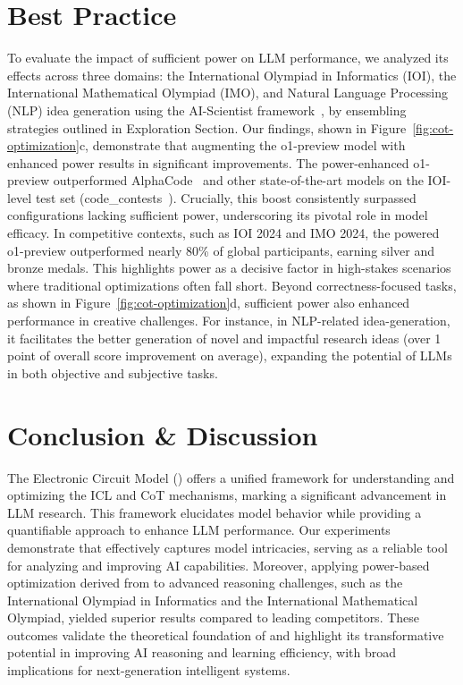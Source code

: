 \section{Best Practice}
To evaluate the impact of sufficient power on LLM performance, we analyzed its effects across three domains: the International Olympiad in Informatics (IOI), the International Mathematical Olympiad (IMO), and Natural Language Processing (NLP) idea generation using the AI-Scientist framework~\cite{lu2024aiscientist}, by ensembling strategies outlined in Exploration Section.
Our findings, shown in Figure~\ref{fig:cot-optimization}c, demonstrate that augmenting the o1-preview model with enhanced power results in significant improvements.
The power-enhanced o1-preview outperformed AlphaCode~\citep{doi:10.1126/science.abq1158} and other state-of-the-art models on the IOI-level test set (code\_contests~\citep{doi:10.1126/science.abq1158}). Crucially, this boost consistently surpassed configurations lacking sufficient power, underscoring its pivotal role in model efficacy.
In competitive contexts, such as IOI 2024 and IMO 2024, the powered o1-preview outperformed nearly 80\% of global participants, earning silver and bronze medals. This highlights power as a decisive factor in high-stakes scenarios where traditional optimizations often fall short.
Beyond correctness-focused tasks, as shown in Figure~\ref{fig:cot-optimization}d, sufficient power also enhanced performance in creative challenges. For instance, in NLP-related idea-generation, it facilitates the better generation of novel and impactful research ideas (over 1 point of overall score improvement on average), expanding the potential of LLMs in both objective and subjective tasks.

\section{Conclusion \& Discussion}
The Electronic Circuit Model (\modelname{}) offers a unified framework for understanding and optimizing the ICL and CoT mechanisms, marking a significant advancement in LLM research. This framework elucidates model behavior while providing a quantifiable approach to enhance LLM performance. Our experiments demonstrate that \modelname{} effectively captures model intricacies, serving as a reliable tool for analyzing and improving AI capabilities. Moreover, applying power-based optimization derived from \modelname{} to advanced reasoning challenges, such as the International Olympiad in Informatics and the International Mathematical Olympiad, yielded superior results compared to leading competitors. These outcomes validate the theoretical foundation of \modelname{} and highlight its transformative potential in improving AI reasoning and learning efficiency, with broad implications for next-generation intelligent systems.
